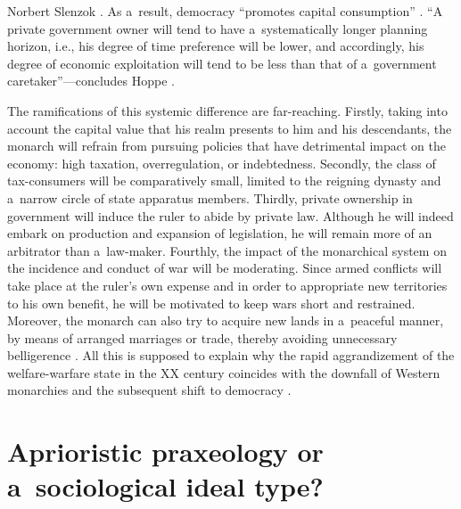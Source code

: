 \begin{artengenv}{Norbert Slenzok}
\parencite[][pp.45–46]{hoppe_democracy_2007}. %
 As a~result, democracy ``promotes capital consumption'' 
\parencite[][p.119]{hoppe_short_2015}. %
 ``A private government owner will tend to have a~systematically longer planning horizon, i.e., his degree of time preference will be lower, and accordingly, his degree of economic exploitation will tend to be less than that of a~government caretaker''---concludes Hoppe 
\parencite*[][p.46]{hoppe_democracy_2007}.%




The ramifications of this systemic difference are far-reaching. Firstly, taking into account the capital value that his realm presents to him and his descendants, the monarch will refrain from pursuing policies that have detrimental impact on the economy: high taxation, overregulation, or indebtedness. Secondly, the class of tax-consumers will be comparatively small, limited to the reigning dynasty and a~narrow circle of state apparatus members. Thirdly, private ownership in government will induce the ruler to abide by private law. Although he will indeed embark on production and expansion of legislation, he will remain more of an arbitrator than a~law-maker. Fourthly, the impact of the monarchical system on the incidence and conduct of war will be moderating. Since armed conflicts will take place at the ruler's own expense and in order to appropriate new territories to his own benefit, he will be motivated to keep wars short and restrained. Moreover, the monarch can also try to acquire new lands in a~peaceful manner, by means of arranged marriages or trade, thereby avoiding unnecessary belligerence 
\parencite[][pp.19–23, 46–50]{hoppe_democracy_2007}. %
 All this is supposed to explain why the rapid aggrandizement of the welfare-warfare state in the XX century coincides with the downfall of Western monarchies and the subsequent shift to democracy 
\parencite[][pp.50–74]{hoppe_democracy_2007}.%




\section{Aprioristic praxeology or a~sociological ideal type?}


\end{artengenv}
